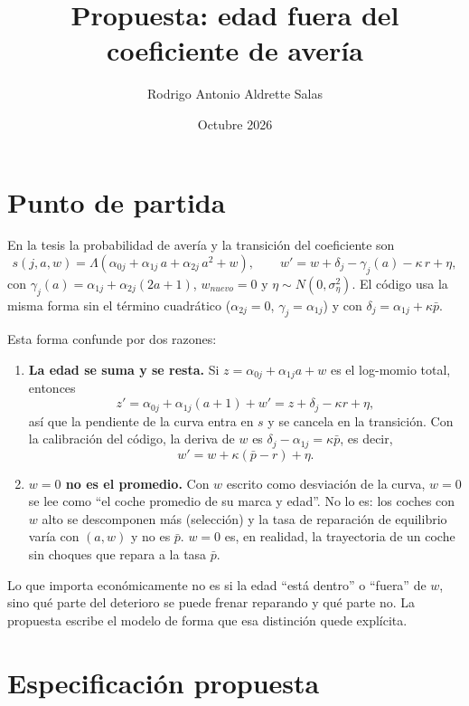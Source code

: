 \documentclass{article}
\title{Propuesta: edad fuera del coeficiente de avería}
\author{Rodrigo Antonio Aldrette Salas}
\date{Octubre 2026}
\begin{document}
\maketitle


\section{Punto de partida}

En la tesis la probabilidad de avería y la transición del coeficiente son
$$s(j,a,w)=\Lambda\left(\alpha_{0j}+\alpha_{1j}\,a+\alpha_{2j}\,a^2+w\right),\qquad
w'=w+\delta_j-\gamma_j(a)-\kappa\, r+\eta,$$
con $\gamma_j(a)=\alpha_{1j}+\alpha_{2j}(2a+1)$, $w_{nuevo}=0$ y $\eta\sim N(0,\sigma_\eta^2)$. El código usa la misma forma sin el término cuadrático ($\alpha_{2j}=0$, $\gamma_j=\alpha_{1j}$) y con $\delta_j=\alpha_{1j}+\kappa\bar{p}$.

Esta forma confunde por dos razones:
\begin{enumerate}
    \item \textbf{La edad se suma y se resta.} Si $z=\alpha_{0j}+\alpha_{1j}a+w$ es el log-momio total, entonces
    $$z'=\alpha_{0j}+\alpha_{1j}(a+1)+w'=z+\delta_j-\kappa r+\eta ,$$
    así que la pendiente de la curva entra en $s$ y se cancela en la transición. Con la calibración del código, la deriva de $w$ es $\delta_j-\alpha_{1j}=\kappa\bar{p}$, es decir,
    $$w'=w+\kappa(\bar{p}-r)+\eta .$$
    \item \textbf{$w=0$ no es el promedio.} Con $w$ escrito como desviación de la curva, $w=0$ se lee como ``el coche promedio de su marca y edad''. No lo es: los coches con $w$ alto se descomponen más (selección) y la tasa de reparación de equilibrio varía con $(a,w)$ y no es $\bar{p}$. $w=0$ es, en realidad, la trayectoria de un coche sin choques que repara a la tasa $\bar{p}$.
\end{enumerate}

Lo que importa económicamente no es si la edad ``está dentro'' o ``fuera'' de $w$, sino qué parte del deterioro se puede frenar reparando y qué parte no. La propuesta escribe el modelo de forma que esa distinción quede explícita.

\section{Especificación propuesta}
\end{document}
